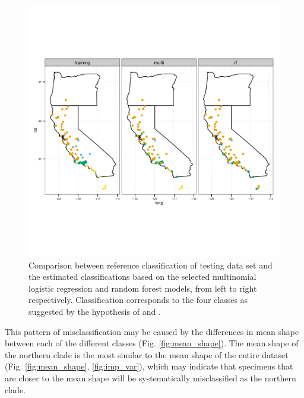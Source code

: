 \documentclass[12pt,letterpaper]{article}\usepackage{graphicx, color}
\begin{document}
\begin{figure}[ht]
  \centering
  \includegraphics[width = \textwidth]{figure/gen_map}
  \caption{Comparison between reference classification of testing data set and the estimated classifications based on the selected multinomial logistic regression and random forest models, from left to right respectively. Classification corresponds to the four classes as suggested by the hypothesis of \citet{Spinks2005} and \citet{Spinks2010}.}
  \label{fig:gen_map}
\end{figure}

This pattern of misclassification may be caused by the differences in mean shape between each of the different classes (Fig. \ref{fig:mean_shape}). The mean shape of the northern clade is the most similar to the mean shape of the entire dataset (Fig. \ref{fig:mean_shape}, \ref{fig:imp_var}), which may indicate that specimens that are closer to the mean shape will be systematically misclassified as the northern clade.
\end{document}
